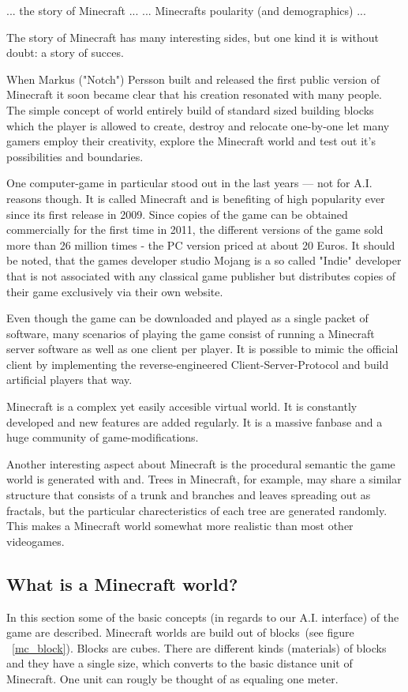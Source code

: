 ... the story of Minecraft ...
... Minecrafts poularity (and demographics) ...

The story of Minecraft has many interesting sides, but one kind it is without doubt: a story of succes.

When Markus ("Notch") Persson built and released the first public version of Minecraft it soon became clear that his creation resonated with many people. The simple concept of world entirely build of standard sized building blocks which the player is allowed to create, destroy and relocate one-by-one let many gamers employ their creativity, explore the Minecraft world and test out it's possibilities and boundaries.

One computer-game in particular stood out in the last years --- not for A.I. reasons though. It is called Minecraft and is benefiting of high popularity ever since its first release in 2009. Since copies of the game can be obtained commercially for the first time in 2011, the different versions of the game sold more than 26 million times - the PC version priced at about 20 Euros. It should be noted, that the games developer studio Mojang is a so called "Indie" developer that is not associated with any classical game publisher but distributes copies of their game exclusively via their own website.

Even though the game can be downloaded and played as a single packet of software, many scenarios of playing the game consist of running a Minecraft server software as well as one client per player. It is possible to mimic the official client by implementing the reverse-engineered Client-Server-Protocol and build artificial players that way.

Minecraft is a complex yet easily accesible virtual world. It is constantly developed and new features are added regularly. It is a massive fanbase and a huge community of game-modifications.

Another interesting aspect about Minecraft is the procedural semantic the game world is generated with and. Trees in Minecraft, for example, may share a similar structure that consists of a trunk and branches and leaves spreading out as fractals, but the particular charecteristics of each tree are generated randomly. This makes a Minecraft world somewhat more realistic than most other videogames.

        \subsection{What is a Minecraft world?}
In this section some of the basic concepts (in regards to our A.I. interface) of the game are described. Minecraft worlds are build out of blocks~(see figure ~\ref{mc_block}). Blocks are cubes. There are different kinds (materials) of blocks and they have a single size, which converts to the basic distance unit of Minecraft. One unit can rougly be thought of as equaling one meter.

